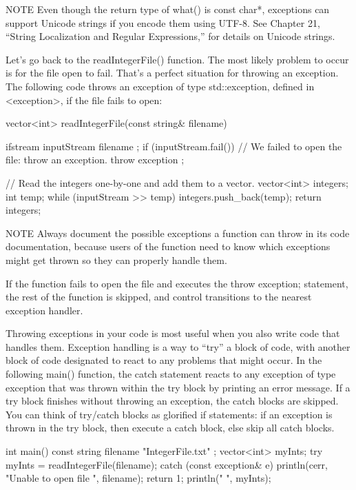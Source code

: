 \begin{myNotic}{NOTE}
Even though the return type of what() is const char*, exceptions can support Unicode strings if you encode them using UTF-8. See Chapter 21, “String Localization and Regular Expressions,” for details on Unicode strings.
\end{myNotic}

Let’s go back to the readIntegerFile() function. The most likely problem to occur is for the file open to fail. That’s a perfect situation for throwing an exception. The following code throws an exception of type std::exception, defined in <exception>, if the file fails to open:

\begin{cpp}
vector<int> readIntegerFile(const string& filename)
{
    ifstream inputStream { filename };
    if (inputStream.fail()) {
        // We failed to open the file: throw an exception.
        throw exception {};
    }

    // Read the integers one-by-one and add them to a vector.
    vector<int> integers;
    int temp;
    while (inputStream >> temp) {
        integers.push_back(temp);
    }
    return integers;
}
\end{cpp}

\begin{myNotic}{NOTE}
Always document the possible exceptions a function can throw in its code documentation, because users of the function need to know which exceptions might get thrown so they can properly handle them.
\end{myNotic}

If the function fails to open the file and executes the throw exception{}; statement, the rest of the function is skipped, and control transitions to the nearest exception handler.

Throwing exceptions in your code is most useful when you also write code that handles them. Exception handling is a way to “try” a block of code, with another block of code designated to react to any problems that might occur. In the following main() function, the catch statement reacts to any exception of type exception that was thrown within the try block by printing an error message. If a try block finishes without throwing an exception, the catch blocks are skipped. You can think of try/catch blocks as glorified if statements: if an exception is thrown in the try block, then execute a catch block, else skip all catch blocks.

\begin{cpp}
int main()
{
    const string filename { "IntegerFile.txt" };
    vector<int> myInts;
    try {
        myInts = readIntegerFile(filename);
    } catch (const exception& e) {
        println(cerr, "Unable to open file {}", filename);
        return 1;
    }
    println("{} ", myInts);
}
\end{cpp}

